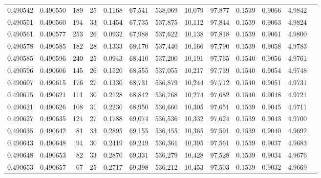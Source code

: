 \begin{tabular}{rrrrrrrrrrrrr}
0.490542 & 0.490550 & 189 &  25 &                                     0.1168 &  67,541 & 538,069 &  10,079 &  97,877 & 0.1539 & 0.9066 & 4.9842 \\
0.490551 & 0.490560 & 194 &  33 &                                     0.1454 &  67,735 & 537,875 &  10,112 &  97,844 & 0.1539 & 0.9063 & 4.9824 \\
0.490561 & 0.490577 & 253 &  26 &                                     0.0932 &  67,988 & 537,622 &  10,138 &  97,818 & 0.1539 & 0.9061 & 4.9800 \\
0.490578 & 0.490585 & 182 &  28 &                                     0.1333 &  68,170 & 537,440 &  10,166 &  97,790 & 0.1539 & 0.9058 & 4.9783 \\
0.490585 & 0.490596 & 240 &  25 &                                     0.0943 &  68,410 & 537,200 &  10,191 &  97,765 & 0.1540 & 0.9056 & 4.9761 \\
0.490596 & 0.490606 & 145 &  26 &                                     0.1520 &  68,555 & 537,055 &  10,217 &  97,739 & 0.1540 & 0.9054 & 4.9748 \\
0.490607 & 0.490615 & 176 &  27 &                                     0.1330 &  68,731 & 536,879 &  10,244 &  97,712 & 0.1540 & 0.9051 & 4.9731 \\
0.490615 & 0.490621 & 111 &  30 &                                     0.2128 &  68,842 & 536,768 &  10,274 &  97,682 & 0.1540 & 0.9048 & 4.9721 \\
0.490621 & 0.490626 & 108 &  31 &                                     0.2230 &  68,950 & 536,660 &  10,305 &  97,651 & 0.1539 & 0.9045 & 4.9711 \\
0.490627 & 0.490635 & 124 &  27 &                                     0.1788 &  69,074 & 536,536 &  10,332 &  97,624 & 0.1539 & 0.9043 & 4.9700 \\
0.490635 & 0.490642 &  81 &  33 &                                     0.2895 &  69,155 & 536,455 &  10,365 &  97,591 & 0.1539 & 0.9040 & 4.9692 \\
0.490643 & 0.490648 &  94 &  30 &                                     0.2419 &  69,249 & 536,361 &  10,395 &  97,561 & 0.1539 & 0.9037 & 4.9683 \\
0.490648 & 0.490653 &  82 &  33 &                                     0.2870 &  69,331 & 536,279 &  10,428 &  97,528 & 0.1539 & 0.9034 & 4.9676 \\
0.490653 & 0.490657 &  67 &  25 &                                     0.2717 &  69,398 & 536,212 &  10,453 &  97,503 & 0.1539 & 0.9032 & 4.9669 \\

\end{tabular}

